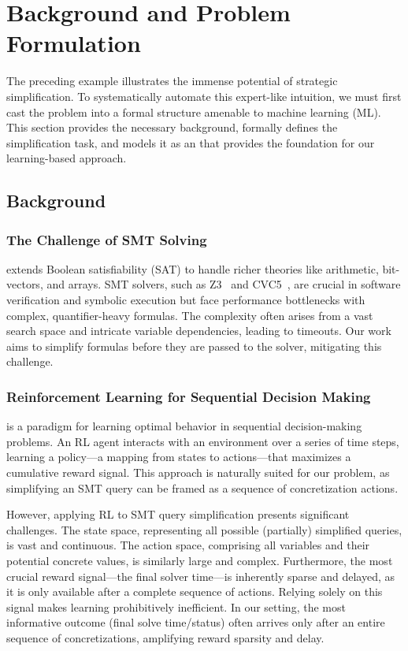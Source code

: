 \section{Background and Problem Formulation}
\label{sec:problem-formulation-and-background}

The preceding example illustrates the immense potential of strategic simplification. To systematically automate this expert-like intuition, we must first cast the problem into a formal structure amenable to machine learning (ML). This section provides the necessary background, formally defines the simplification task, and models it as an \MDP{} that provides the foundation for our learning-based approach.

\subsection{Background}
\label{sec:background}

\subsubsection{The Challenge of SMT Solving}
\SMT{} extends Boolean satisfiability (SAT) to handle richer theories like arithmetic, bit-vectors, and arrays. SMT solvers, such as Z3~\cite{demoura2008z3} and CVC5~\cite{cvc5}, are crucial in software verification and symbolic execution but face performance bottlenecks with complex, quantifier-heavy formulas. The complexity often arises from a vast search space and intricate variable dependencies, leading to timeouts. Our work aims to simplify formulas before they are passed to the solver, mitigating this challenge.

\subsubsection{Reinforcement Learning for Sequential Decision Making}
\RL{} is a paradigm for learning optimal behavior in sequential decision-making problems. An RL agent interacts with an environment over a series of time steps, learning a policy—a mapping from states to actions—that maximizes a cumulative reward signal. This approach is naturally suited for our problem, as simplifying an SMT query can be framed as a sequence of concretization actions.

However, applying RL to SMT query simplification presents significant challenges. The state space, representing all possible (partially) simplified queries, is vast and continuous. The action space, comprising all variables and their potential concrete values, is similarly large and complex. Furthermore, the most crucial reward signal—the final solver time—is inherently sparse and delayed, as it is only available after a complete sequence of actions. Relying solely on this signal makes learning prohibitively inefficient. In our setting, the most informative outcome (final solve time/status) often arrives only after an entire sequence of concretizations, amplifying reward sparsity and delay.

